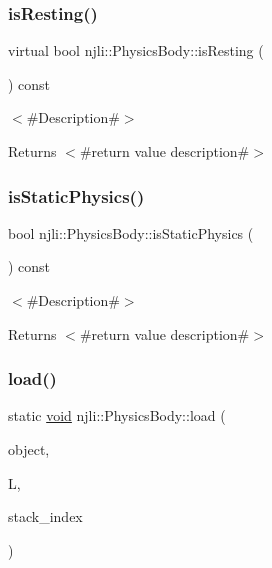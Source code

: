 \subsubsection{\texorpdfstring{is\+Resting()}{isResting()}}
{\footnotesize\ttfamily virtual bool njli\+::\+Physics\+Body\+::is\+Resting (\begin{DoxyParamCaption}{ }\end{DoxyParamCaption}) const\hspace{0.3cm}{\ttfamily [virtual]}}

$<$\#\+Description\#$>$

\begin{DoxyReturn}{Returns}
$<$\#return value description\#$>$ 
\end{DoxyReturn}
\mbox{\label{classnjli_1_1_physics_body_a9371ebdae5ef5e8de3ac5d132a98811e}} 
\subsubsection{\texorpdfstring{is\+Static\+Physics()}{isStaticPhysics()}}
{\footnotesize\ttfamily bool njli\+::\+Physics\+Body\+::is\+Static\+Physics (\begin{DoxyParamCaption}{ }\end{DoxyParamCaption}) const}

$<$\#\+Description\#$>$

\begin{DoxyReturn}{Returns}
$<$\#return value description\#$>$ 
\end{DoxyReturn}
\mbox{\label{classnjli_1_1_physics_body_a4f490b34152c1355ca09c1f6cdc0be83}} 
\subsubsection{\texorpdfstring{load()}{load()}}
{\footnotesize\ttfamily static \mbox{\hyperlink{_thread_8h_af1e856da2e658414cb2456cb6f7ebc66}{void}} njli\+::\+Physics\+Body\+::load (\begin{DoxyParamCaption}\item[{\mbox{\hyperlink{classnjli_1_1_physics_body}{Physics\+Body}} \&}]{object,  }\item[{lua\+\_\+\+State $\ast$}]{L,  }\item[{int}]{stack\+\_\+index }\end{DoxyParamCaption})\hspace{0.3cm}{\ttfamily [static]}}

